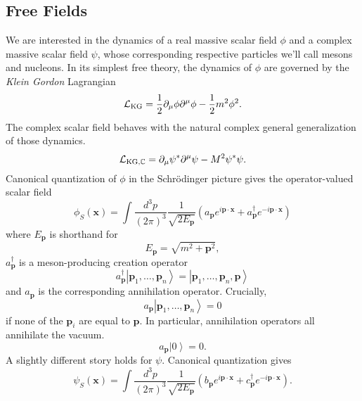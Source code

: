 \documentclass[12 pt]{article}
\newcommand{\C}{\mathbb{C}}
\newcommand{\KET}[1]{\left| #1 \right\rangle }
\newcommand{\B}[1]{\mathbf{#1}}
\newcommand{\LA}{\mathcal{L}}
\newcommand{\LP}{\left(}
\newcommand{\RP}{\right)}
\newcommand{\D}{\partial}
\numberwithin{equation}{section}
\begin{document}
\subsection{Free Fields}
We are interested in the dynamics of a real massive scalar field $\phi$ and a complex massive scalar field $\psi$, whose corresponding respective particles we'll call mesons and nucleons. In its simplest free theory, the dynamics of $\phi$ are governed by the \textit{Klein Gordon} Lagrangian \begin{equation*}
\LA_{\mbox{\scriptsize{KG}}} = \frac{1}{2} \D_\mu \phi \D^\mu \phi - \frac{1}{2} m^2 \phi^2.
\end{equation*}
The complex scalar field behaves with the natural complex general generalization of those dynamics. \begin{equation*}
\LA_{\mbox{\scriptsize{KG}}, \C} = \D_\mu  \psi^* \D^\mu  \psi - M^2 \psi^* \psi .
\end{equation*}
Canonical quantization of $\phi$ in the Schr\"{o}dinger picture gives the operator-valued scalar field \begin{equation*}
\phi_S (\B{x}) =  \int \frac{d^3 p}{(2 \pi)^3} \frac{1}{\sqrt{2 E_\B{p}}} \LP a_{\B{p}} e^{i \B{p} \cdot \B{x}} + a^\dagger_{\B{p}} e^{- i \B{p} \cdot \B{x}} \RP
\end{equation*}
where $E_\B{p}$ is shorthand for \begin{equation*}
E_\B{p} = \sqrt{m^2 + \B{p}^2},
\end{equation*}
 $a^\dagger _\B{p}$ is a meson-producing creation operator \begin{equation*}
a^\dagger _\B{p} \KET{\B{p}_1, \ldots, \B{p}_n} = \KET{\B{p}_1, \ldots, \B{p}_n, \B{p}}
\end{equation*}
and $a_\B{p}$ is the corresponding annihilation operator. Crucially, \begin{equation*}
a_{\B{p}} \KET{\B{p}_1, \ldots, \B{p}_n} = 0
\end{equation*}
if none of the $\B{p}_i$ are equal to $\B{p}$. In particular, annihilation operators all annihilate the vacuum. \begin{equation*}
a_{\B{p}} \KET{0} = 0.
\end{equation*}
A slightly different story holds for $\psi$. Canonical quantization gives \begin{equation*}
\psi_S (\B{x}) =  \int \frac{d^3 p}{(2 \pi)^3} \frac{1}{\sqrt{2 E_\B{p}}} \LP b_{\B{p}} e^{i \B{p} \cdot \B{x}} + c^\dagger_{\B{p}} e^{- i \B{p} \cdot \B{x}} \RP.
\end{equation*}
\end{document}
